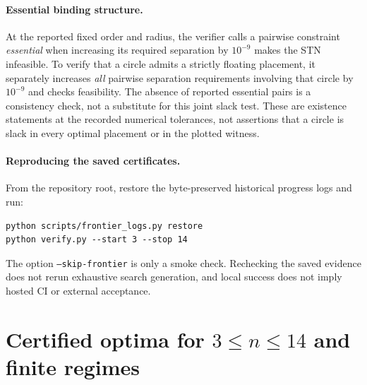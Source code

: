 \documentclass[11pt]{article}
\theoremstyle{definition}
\theoremstyle{remark}
\begin{document}
\paragraph{Essential binding structure.} At the reported fixed order and radius, the verifier calls a pairwise constraint \emph{essential} when increasing its required separation by $10^{-9}$ makes the STN infeasible. To verify that a circle admits a strictly floating placement, it separately increases \emph{all} pairwise separation requirements involving that circle by $10^{-9}$ and checks feasibility. The absence of reported essential pairs is a consistency check, not a substitute for this joint slack test. These are existence statements at the recorded numerical tolerances, not assertions that a circle is slack in every optimal placement or in the plotted witness.

\paragraph{Reproducing the saved certificates.} From the repository root, restore the byte-preserved historical progress logs and run:
\begin{verbatim}
python scripts/frontier_logs.py restore
python verify.py --start 3 --stop 14
\end{verbatim}
The option \texttt{--skip-frontier} is only a smoke check. Rechecking the saved evidence does not rerun exhaustive search generation, and local success does not imply hosted CI or external acceptance.

\section{Certified optima for \texorpdfstring{$3\le n\le14$}{3 <= n <= 14} and finite regimes}\label{sec:results}
\end{document}
